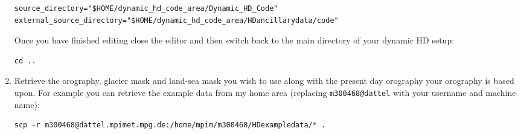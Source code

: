 \documentclass{article}
\begin{document}
\begin{enumerate}
\begin{lstlisting}[style=bash_input,breaklines=true]
source_directory="$HOME/dynamic_hd_code_area/Dynamic_HD_Code"
external_source_directory="$HOME/dynamic_hd_code_area/HDancillarydata/code"
\end{lstlisting}
Once you have finished editing close the editor and then switch back to the main directory of your dynamic HD setup:
\begin{lstlisting}[style=bash_input]
cd ..
\end{lstlisting}
\item Retrieve the orography, glacier mask and land-sea mask you wish to use along with the present day orography your orography is based upon. For example you can retrieve the example data from my home area (replacing \lstinline[style=bash_input]{m300468@dattel} with your username and machine name):
\begin{lstlisting}[style=bash_input,breaklines=true]
scp -r m300468@dattel.mpimet.mpg.de:/home/mpim/m300468/HDexampledata/* .
\end{lstlisting}

\end{enumerate}
\end{document}
